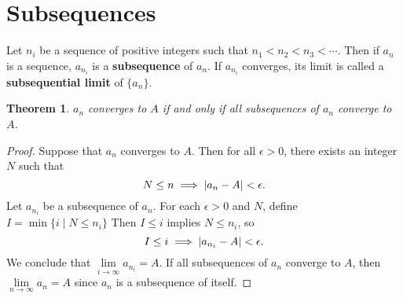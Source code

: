 \documentclass[11pt]{article}
\newtheorem{theorem}{Theorem}
\begin{document}

\newpage

\section{Subsequences}

Let $n_{i}$ be a sequence of positive integers such that $n_{1} < n_{2} < n_{3} < \cdots$. Then if $a_{n}$ is a sequence, $a_{n_{i}}$ is a \textbf{subsequence} of $a_{n}$. If $a_{n_{i}}$ converges, its limit is called a \textbf{subsequential limit} of $\{ a_{n} \}$.

\begin{theorem}
	$a_{n}$ converges to $A$ if and only if all subsequences of $a_{n}$ converge to $A$.
\end{theorem}
\begin{adjustwidth}{0.5cm}{}
	\begin{proof}
		Suppose that $a_{n}$ converges to $A$. Then for all $\epsilon > 0$, there exists an integer $N$ such that
		\[
			N \le n \implies \abs{a_{n} - A} < \epsilon.
		\]
		Let $a_{n_{i}}$ be a subsequence of $a_{n}$. For each $\epsilon > 0$ and $N$, define $I = \min \{ i \mid N \le n_{i} \}$ Then $I \le i$ implies $N \le n_{i}$, so
		\[
			I \le i \implies \abs{a_{n_{i}} - A} < \epsilon.
		\]
		We conclude that $\lim\limits_{i \to \infty} a_{n_{i}} = A$. If all subsequences of $a_{n}$ converge to $A$, then $\lim\limits_{n \to \infty} a_{n} = A$ since $a_{n}$ is a subsequence of itself.
	\end{proof}
\end{adjustwidth}
\end{document}
